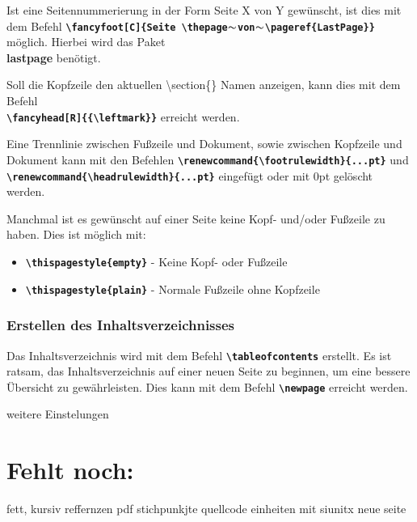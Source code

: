 Ist eine Seitennummerierung in der Form Seite X von Y gewünscht, ist dies mit dem Befehl \textbf{\texttt{\textbackslash fancyfoot[C]\{Seite \textbackslash thepage$\thicksim$von$\thicksim$\textbackslash pageref\{LastPage\}\}}} möglich. Hierbei wird das Paket \\ \textbf{lastpage} benötigt.

Soll die Kopfzeile den aktuellen \textbackslash section\{\} Namen anzeigen, kann dies mit dem Befehl \\ \textbf{\texttt{\textbackslash fancyhead[R]\{\{\textbackslash leftmark\}\}}} erreicht werden.

Eine Trennlinie zwischen Fußzeile und Dokument, sowie zwischen Kopfzeile und Dokument kann mit den Befehlen \textbf{\texttt{\textbackslash renewcommand\{\textbackslash footrulewidth\}\{...pt\}}} und \textbf{\texttt{\textbackslash renewcommand\{\textbackslash headrulewidth\}\{...pt\}}} eingefügt oder mit 0pt gelöscht werden.

Manchmal ist es gewünscht auf einer Seite keine Kopf- und/oder Fußzeile zu haben. Dies ist möglich mit:
\begin{itemize}
    \item \textbf{\texttt{\textbackslash thispagestyle\{empty\}}} - Keine Kopf- oder Fußzeile
    \item \textbf{\texttt{\textbackslash thispagestyle\{plain\}}} - Normale Fußzeile ohne Kopfzeile
\end{itemize}

\subsubsection{Erstellen des Inhaltsverzeichnisses}
Das Inhaltsverzeichnis wird mit dem Befehl \textbf{\texttt{\textbackslash tableofcontents}} erstellt. Es ist ratsam, das Inhaltsverzeichnis auf einer neuen Seite zu beginnen, um eine bessere Übersicht zu gewährleisten. Dies kann mit dem Befehl \textbf{\texttt{\textbackslash newpage}} erreicht werden.

weitere  Einstelungen
\newpage

\section{Fehlt noch:}


fett, kursiv
reffernzen
%
pdf
stichpunkjte
quellcode
einheiten mit siunitx
neue seite
